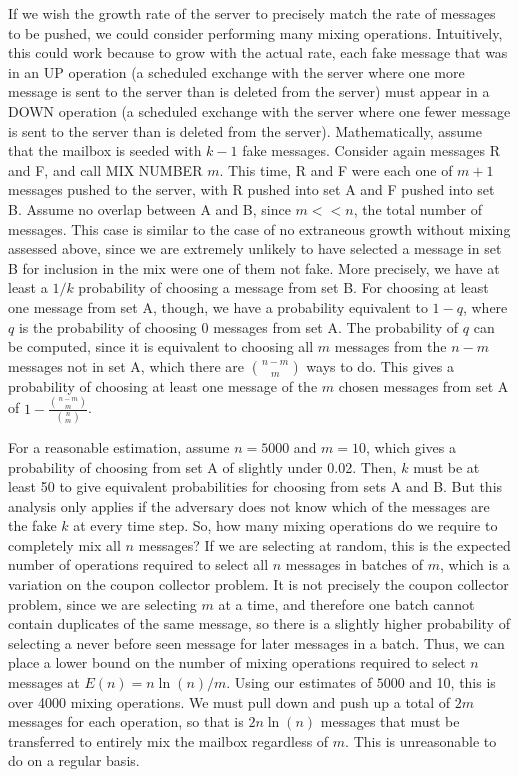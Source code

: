 \documentclass[pageno]{jpaper}
\begin{document}
If we wish the growth rate of the server to precisely match the rate of messages to be pushed, we could consider performing many mixing operations. Intuitively, this could work because to grow with the actual rate, each fake message that was in an UP operation (a scheduled exchange with the server where one more message is sent to the server than is deleted from the server) must appear in a DOWN operation (a scheduled exchange with the server where one fewer message is sent to the server than is deleted from the server). Mathematically, assume that the mailbox is seeded with $k-1$ fake messages. Consider again messages R and F, and call MIX NUMBER $m$. This time, R and F were each one of $m + 1$ messages pushed to the server, with R pushed into set A and F pushed into set B. Assume no overlap between A and B, since $m<<n$, the total number of messages. This case is similar to the case of no extraneous growth without mixing assessed above, since we are extremely unlikely to have selected a message in set B for inclusion in the mix were one of them not fake. More precisely, we have at least a $1/k$ probability of choosing a message from set B. For choosing at least one message from set A, though, we have a probability equivalent to $1-q$, where $q$ is the probability of choosing 0 messages from set A. The probability of $q$ can be computed, since it is equivalent to choosing all $m$ messages from the $n-m$ messages not in set A, which there are ${{n-m}\choose m}$ ways to do. This gives a probability of choosing at least one message of the $m$ chosen messages from set A of $1-\frac{{{n-m}\choose m}}{{n \choose m}}$.

For a reasonable estimation, assume $n=5000$ and $m=10$, which gives a probability of choosing from set A of slightly under 0.02. Then, $k$ must be at least 50 to give equivalent probabilities for choosing from sets A and B. But this analysis only applies if the adversary does not know which of the messages are the fake $k$ at every time step. So, how many mixing operations do we require to completely mix all $n$ messages? If we are selecting at random, this is the expected number of operations required to select all $n$ messages in batches of $m$, which is a variation on the coupon collector problem. It is not precisely the coupon collector problem, since we are selecting $m$ at a time, and therefore one batch cannot contain duplicates of the same message, so there is a slightly higher probability of selecting a never before seen message for later messages in a batch. Thus, we can place a lower bound on the number of mixing operations required to select $n$ messages at $E(n) = n \ln (n) / m$. Using our estimates of $5000$ and 10, this is over 4000 mixing operations. We must pull down and push up a total of $2m$ messages for each operation, so that is $2n\ln (n)$ messages that must be transferred to entirely mix the mailbox regardless of $m$. This is unreasonable to do on a regular basis.
\end{document}
